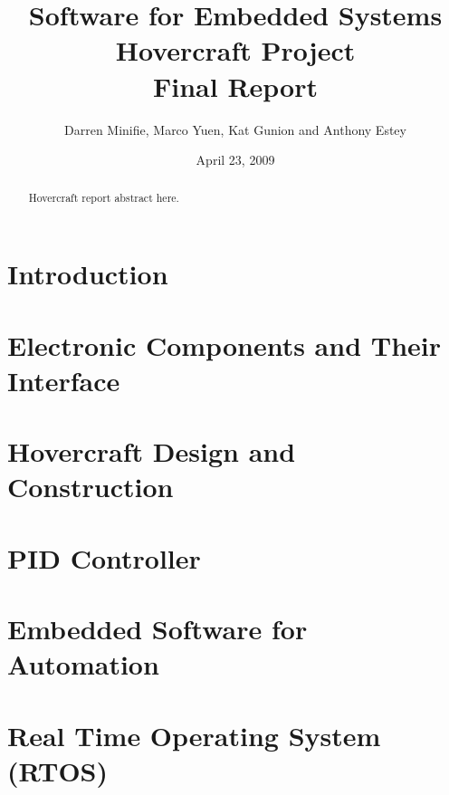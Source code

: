 \documentclass{article}
\begin{document}


\title{Software for Embedded Systems\\Hovercraft Project\\Final Report}


\author{Darren Minifie, Marco Yuen, Kat Gunion and Anthony Estey}

\date{April 23, 2009}
\maketitle
\begin{abstract}
Hovercraft report abstract here.
\end{abstract}

\tableofcontents
\listoffigures
\listoftables
\newpage





\section{Introduction}


\section{Electronic Components and Their Interface}


\section{Hovercraft Design and Construction}


\section{PID Controller}


\section{Embedded Software for Automation}
\label{embeddedSoftwareAutomation}


\section{Real Time Operating System (RTOS)}

\end{document}
